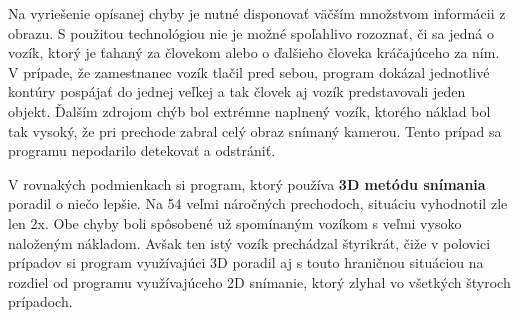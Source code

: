 Na vyriešenie opísanej chyby je nutné disponovať väčším množstvom informácii z obrazu. S použitou technológiou nie je možné spoľahlivo rozoznať, či sa jedná o vozík, ktorý je ťahaný za človekom alebo o ďalšieho človeka kráčajúceho za ním. V prípade, že zamestnanec vozík tlačil pred sebou, program dokázal jednotlivé kontúry pospájať do jednej veľkej a tak človek aj vozík predstavovali jeden objekt. Ďalším zdrojom chýb bol extrémne naplnený vozík, ktorého náklad bol tak vysoký, že pri prechode zabral celý obraz snímaný kamerou. Tento prípad sa programu nepodarilo detekovať a odstrániť.

V rovnakých podmienkach si program, ktorý používa \textbf{3D metódu snímania} poradil o niečo lepšie. Na 54 veľmi náročných prechodoch, situáciu vyhodnotil zle len 2x. Obe chyby boli spôsobené už spomínaným vozíkom s veľmi vysoko naloženým nákladom. Avšak ten istý vozík prechádzal štyrikrát, čiže v polovici prípadov si program využívajúci 3D poradil aj s touto hraničnou situáciou na rozdiel od programu využívajúceho 2D snímanie, ktorý zlyhal vo všetkých štyroch prípadoch. 

